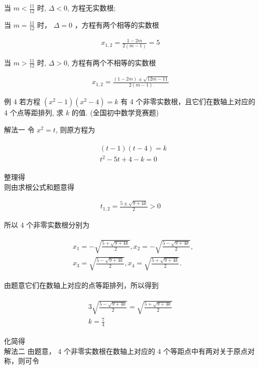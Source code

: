 \documentclass[10pt]{article}
\begin{document}
当 $m<\frac{11}{12}$ 时, $\Delta<0$, 方程无实数根;

当 $m=\frac{11}{12}$ 时， $\Delta=0$ ，方程有两个相等的实数根

\begin{align*}
x_{1,2}=\frac{1-2 m}{2(m-1)}=5
\end{align*}

当 $m>\frac{11}{12}$ 时, $\Delta>0$, 方程有两个不相等的实数根

\begin{align*}
x_{1,2}=\frac{(1-2 m) \pm \sqrt{12 m-11}}{2(m-1)}
\end{align*}

例 4 若方程 $\left(x^{2}-1\right)\left(x^{2}-4\right)=k$ 有 4 个非零实数根，且它们在数轴上对应的 4 个点等距排列, 求 $k$ 的值. (全国初中数学竞赛题)

解法一 令 $x^{2}=t$, 则原方程为

\begin{align*}
\begin{aligned}
& (t-1)(t-4)=k \\
& t^{2}-5 t+4-k=0
\end{aligned}
\end{align*}

整理得\\
则由求根公式和题意得

\begin{align*}
t_{1,2}=\frac{5 \pm \sqrt{9+4 k}}{2}>0
\end{align*}

所以 4 个非零实数根分别为

\begin{align*}
\begin{aligned}
& x_{1}=-\sqrt{\frac{5+\sqrt{9+4 k}}{2}}, x_{2}=-\sqrt{\frac{5-\sqrt{9+4 k}}{2}}, \\
& x_{3}=\sqrt{\frac{5-\sqrt{9+4 k}}{2}}, x_{4}=\sqrt{\frac{5+\sqrt{9+4 k}}{2}} .
\end{aligned}
\end{align*}

由题意它们在数轴上对应的点等距排列，所以得到

\begin{align*}
\begin{gathered}
3 \sqrt{\frac{5-\sqrt{9+4 k}}{2}}=\sqrt{\frac{5+\sqrt{9+4 k}}{2}} \\
k=\frac{7}{4}
\end{gathered}
\end{align*}

化简得\\
解法二 由题意， 4 个非零实数根在数轴上对应的 4 个等距点中有两对关于原点对称，则可令
\end{document}
